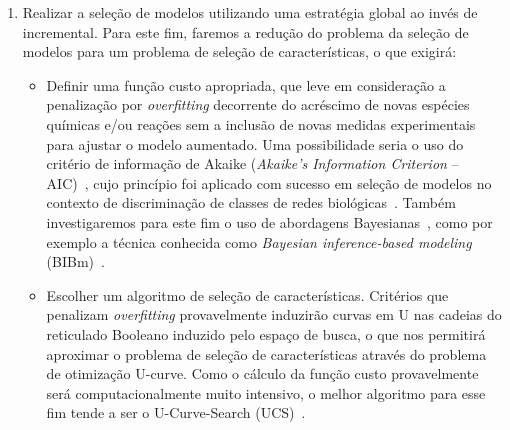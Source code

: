 \documentclass[12pt]{article}
\begin{document}
\begin{enumerate}

\item Realizar a seleção de modelos utilizando uma estratégia global ao invés de incremental. Para este fim, faremos a redução do problema da seleção de modelos para um problema de seleção de características, o que exigirá:
\begin{itemize}
  \item Definir uma função custo apropriada, que leve em consideração a penalização por {\em overfitting} decorrente do acréscimo de novas espécies químicas e/ou reações sem a inclusão de novas medidas experimentais para ajustar o modelo aumentado. Uma possibilidade seria o uso do critério de informação de Akaike ({\em Akaike's Information Criterion} -- AIC)~\cite{bozdogan1987model}, cujo princípio foi aplicado com sucesso em seleção de modelos no contexto de discriminação de classes de redes biológicas~\cite{takahashi2012discriminating}. Também investigaremos para este fim o uso de abordagens Bayesianas~\cite{kirk2013model}, como por exemplo a técnica conhecida como {\em Bayesian inference-based modeling} (BIBm)~\cite{Xu2010}.

  \item Escolher um algoritmo de seleção de características. Critérios que penalizam {\em overfitting} provavelmente induzirão curvas em U nas cadeias do reticulado Booleano induzido pelo espaço de busca, o que nos permitirá aproximar o problema de seleção de características através do problema de otimização U-curve. Como o cálculo da função custo provavelmente será computacionalmente muito intensivo, o melhor algoritmo para esse fim tende a ser o U-Curve-Search (UCS)~\cite{reis2012minimizaccao,reis2017ucsr}.
\end{itemize}


\end{enumerate}
\end{document}
